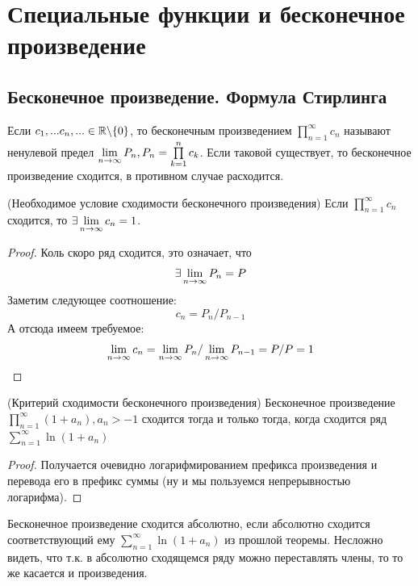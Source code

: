 \section{Специальные функции и бесконечное произведение}

\subsection{Бесконечное произведение. Формула Стирлинга}

\begin{definition}
	Если $c_1,...c_n,...\in\mathbb{R}\backslash\{0\}$, то бесконечным произведением $\prod\limits_{n=1}^\infty c_n$ называют ненулевой предел $\lim\limits_{n\to\infty}P_n, P_n = \prod\limits_{k=1}^n c_k$. Если таковой существует, то бесконечное произведение сходится, в противном случае расходится.
\end{definition}

\begin{theorem} (Необходимое условие сходимости бесконечного произведения)
	Если $\prod\limits_{n=1}^\infty c_n$ сходится, то $\exists \lim\limits_{n \to \infty} c_n = 1$.
\end{theorem}

\begin{proof}
	Коль скоро ряд сходится, это означает, что
	\[
	\exists \lim\limits_{n \to \infty} P_n = P
	\]
	Заметим следующее соотношение:
	\[
	c_n = P_n / P_{n - 1}
	\]
	А отсюда имеем требуемое:
	\[
	\lim\limits_{n \to \infty} c_n = \lim\limits_{n \to \infty} P_n / \lim\limits_{n \to \infty} P_{n - 1} = P / P = 1
	\]
\end{proof}

\begin{theorem}
	(Критерий сходимости бесконечного произведения) Бесконечное произведение $\prod\limits_{n=1}^\infty (1+a_n), a_n > -1$ сходится тогда и только тогда, когда сходится ряд $\sum\limits_{n=1}^\infty \ln{(1 + a_n)}$
\end{theorem}

\begin{proof}
	Получается очевидно логарифмированием префикса произведения и перевода его в префикс суммы (ну и мы пользуемся непрерывностью логарифма).
\end{proof}

\begin{definition}
	Бесконечное произведение сходится абсолютно, если абсолютно сходится соответствующий ему  $\sum\limits_{n=1}^\infty \ln{(1 + a_n)}$ из прошлой теоремы. Несложно видеть, что т.к. в абсолютно сходящемся ряду можно переставлять члены, то то же касается и произведения.
\end{definition}

